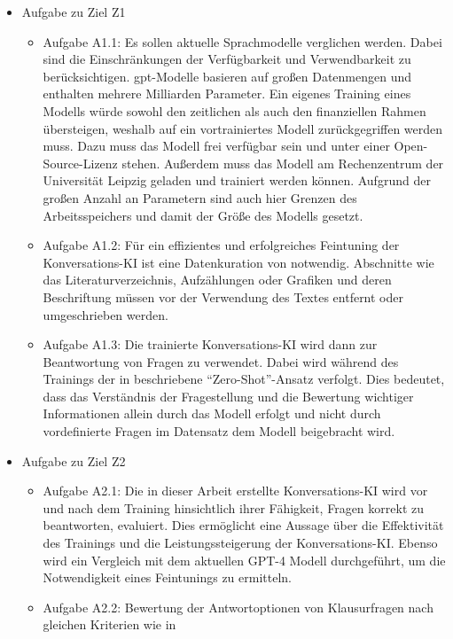 \begin{itemize}
  \item Aufgabe zu Ziel Z1
  \begin{itemize}
    \item Aufgabe A1.1: Es sollen aktuelle Sprachmodelle verglichen werden. Dabei sind die Einschränkungen der Verfügbarkeit und Verwendbarkeit zu berücksichtigen.
    \ac{gpt}-Modelle basieren auf großen Datenmengen und enthalten mehrere Milliarden Parameter.
    Ein eigenes Training eines Modells würde sowohl den zeitlichen als auch den finanziellen Rahmen übersteigen, weshalb auf ein vortrainiertes Modell zurückgegriffen werden muss.
    Dazu muss das Modell frei verfügbar sein und unter einer Open-Source-Lizenz stehen. Außerdem muss das Modell am Rechenzentrum der Universität Leipzig geladen und trainiert werden können. Aufgrund der großen Anzahl an Parametern sind auch hier Grenzen des Arbeitsspeichers und damit der Größe des Modells gesetzt.
    \item Aufgabe A1.2: Für ein effizientes und erfolgreiches Feintuning der Konversations-KI ist eine Datenkuration von \citet{bb} notwendig.
    Abschnitte wie das Literaturverzeichnis, Aufzählungen oder Grafiken und deren Beschriftung müssen vor der Verwendung des Textes entfernt oder umgeschrieben werden.
    \item Aufgabe A1.3: Die trainierte Konversations-KI wird dann zur Beantwortung von Fragen zu \citet{bb} verwendet.
    Dabei wird während des Trainings der in \citet{gpt3} beschriebene \enquote{Zero-Shot}-Ansatz verfolgt.
    Dies bedeutet, dass das Verständnis der Fragestellung und die Bewertung wichtiger Informationen allein durch das Modell erfolgt und nicht durch vordefinierte Fragen im Datensatz dem Modell beigebracht wird.
  \end{itemize}
  \item Aufgabe zu Ziel Z2
  \begin{itemize}
    \item Aufgabe A2.1: Die in dieser Arbeit erstellte Konversations-KI wird vor und nach dem Training hinsichtlich ihrer Fähigkeit, Fragen korrekt zu beantworten, evaluiert.
    Dies ermöglicht eine Aussage über die Effektivität des Trainings und die Leistungssteigerung der Konversations-KI.\@
    Ebenso wird ein Vergleich mit dem aktuellen GPT-4 Modell \citep{gpt4} durchgeführt, um die Notwendigkeit eines Feintunings zu ermitteln.
    \item Aufgabe A2.2: Bewertung der Antwortoptionen von Klausurfragen nach gleichen Kriterien wie in \citet{chatgpt_qas}
  \end{itemize}
\end{itemize}

